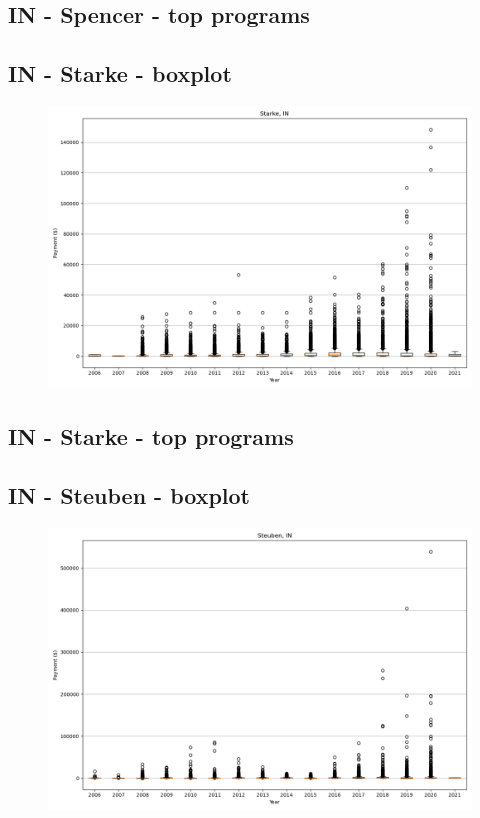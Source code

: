 \subsection*{IN - Spencer - top programs}

\newpage
\subsection*{IN - Starke - boxplot}
\begin{figure}[h]
\centering
\includegraphics[width=7in]{../output/boxplots/counties/Starke-IN_boxplot.png}
\end{figure}


\subsection*{IN - Starke - top programs}

\newpage
\subsection*{IN - Steuben - boxplot}
\begin{figure}[h]
\centering
\includegraphics[width=7in]{../output/boxplots/counties/Steuben-IN_boxplot.png}
\end{figure}


